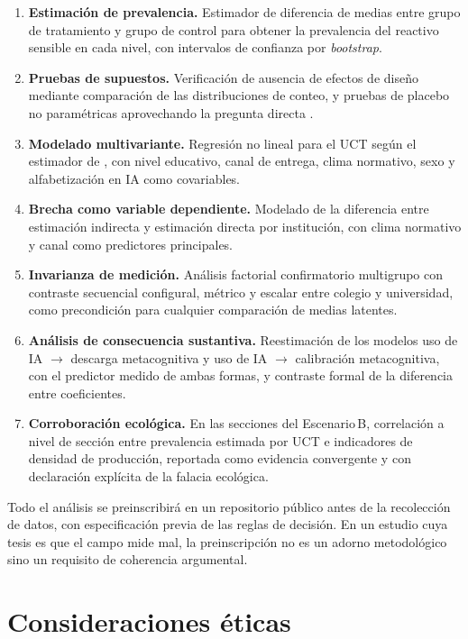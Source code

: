 \documentclass[11pt,a4paper]{article}
\begin{document}
\begin{enumerate}[leftmargin=1.4em,itemsep=0.5em]
	\item \textbf{Estimación de prevalencia.} Estimador de diferencia de medias entre grupo de tratamiento y grupo de control para obtener la prevalencia del reactivo sensible en cada nivel, con intervalos de confianza por \emph{bootstrap}.
	\item \textbf{Pruebas de supuestos.} Verificación de ausencia de efectos de diseño mediante comparación de las distribuciones de conteo, y pruebas de placebo no paramétricas aprovechando la pregunta directa \citep{imai2011multivariate}.
	\item \textbf{Modelado multivariante.} Regresión no lineal para el UCT según el estimador de \citet{imai2011multivariate}, con nivel educativo, canal de entrega, clima normativo, sexo y alfabetización en IA como covariables.
	\item \textbf{Brecha como variable dependiente.} Modelado de la diferencia entre estimación indirecta y estimación directa por institución, con clima normativo y canal como predictores principales.
	\item \textbf{Invarianza de medición.} Análisis factorial confirmatorio multigrupo con contraste secuencial configural, métrico y escalar entre colegio y universidad, como precondición para cualquier comparación de medias latentes.
	\item \textbf{Análisis de consecuencia sustantiva.} Reestimación de los modelos uso de IA $\rightarrow$ descarga metacognitiva y uso de IA $\rightarrow$ calibración metacognitiva, con el predictor medido de ambas formas, y contraste formal de la diferencia entre coeficientes.
	\item \textbf{Corroboración ecológica.} En las secciones del Escenario\,B, correlación a nivel de sección entre prevalencia estimada por UCT e indicadores de densidad de producción, reportada como evidencia convergente y con declaración explícita de la falacia ecológica.
\end{enumerate}

Todo el análisis se preinscribirá en un repositorio público antes de la recolección de datos, con especificación previa de las reglas de decisión. En un estudio cuya tesis es que el campo mide mal, la preinscripción no es un adorno metodológico sino un requisito de coherencia argumental.

\section{Consideraciones éticas}
\end{document}
